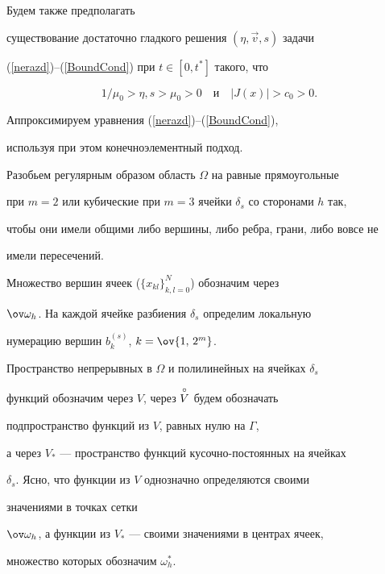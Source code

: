 Будем также предполагать


существование достаточно гладкого решения $(\eta,\Vec v,s)$ задачи


(\ref{nerazd})--(\ref{BoundCond}) при $t\in [0,t^*]$ такого, что


\begin{equation}


\label{6'}


1/\mu_0 > \eta,s > \mu_0>0\quad \text{и}\quad |J(x)|>c_0>0.


\end{equation}





Аппроксимируем уравнения (\ref{nerazd})--(\ref{BoundCond}),


используя при этом конечноэлементный подход.


Разобьем регулярным образом область $\Omega$ на равные прямоугольные 


при $m=2$ или кубические при $m=3$ ячейки $\delta_s$ со сторонами $h$ так,


чтобы они имели общими либо вершины, либо ребра, грани, либо вовсе не 


имели пересечений.


Множество вершин ячеек ($\{x_{kl}\}_{k,l=0}^N$) обозначим через


$\ov \omega_h$. На каждой ячейке разбиения $\delta_s$ определим локальную 


нумерацию вершин $b_k^{(s)}$, $k=\ov{1,\, 2^m}$.





Пространство непрерывных в $\Omega$ и полилинейных на ячейках $\delta_s$


функций обозначим через $V$, через $\overset{\circ}{V}$ будем обозначать


подпространство функций из $V$, равных нулю на $\Gamma$,


а через $V_{*}$ --- пространство функций кусочно-постоянных на ячейках


$\delta_s$. Ясно, что функции из $V$  однозначно определяются своими


значениями в точках сетки 


$\ov \omega_h$, а функции из $V_{*}$ --- своими значениями в центрах ячеек, 


множество которых обозначим $\omega_h^{*}$.





